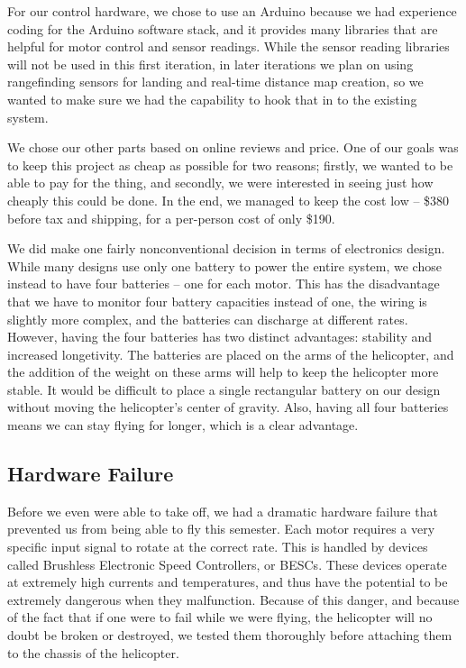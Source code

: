 \documentclass[letterpaper]{article}
\begin{document}
For our control hardware, we chose to use an Arduino because we had
experience coding for the Arduino software stack, and it provides many
libraries that are helpful for motor control and sensor
readings. While the sensor reading libraries will not be used in this
first iteration, in later iterations we plan on using rangefinding
sensors for landing and real-time distance map creation, so we wanted
to make sure we had the capability to hook that in to the existing
system.

We chose our other parts based on online reviews and price. One of our
goals was to keep this project as cheap as possible for two reasons;
firstly, we wanted to be able to pay for the thing, and secondly, we
were interested in seeing just how cheaply this could be done. In the
end, we managed to keep the cost low -- \$380 before tax and shipping,
for a per-person cost of only \$190.

We did make one fairly nonconventional decision in terms of
electronics design. While many designs use only one battery to power
the entire system, we chose instead to have four batteries -- one for
each motor. This has the disadvantage that we have to monitor four
battery capacities instead of one, the wiring is slightly more
complex, and the batteries can discharge at different rates. However,
having the four batteries has two distinct advantages: stability and
increased longetivity. The batteries are placed on the arms of the
helicopter, and the addition of the weight on these arms will help to
keep the helicopter more stable. It would be difficult to place a
single rectangular battery on our design without moving the
helicopter's center of gravity. Also, having all four batteries means
we can stay flying for longer, which is a clear advantage.

\subsection{Hardware Failure}
\label{sec:failure}
Before we even were able to take off, we had a dramatic hardware
failure that prevented us from being able to fly this semester. Each
motor requires a very specific input signal to rotate at the correct
rate. This is handled by devices called Brushless Electronic Speed
Controllers, or BESCs. These devices operate at extremely high
currents and temperatures, and thus have the potential to be extremely
dangerous when they malfunction. Because of this danger, and because
of the fact that if one were to fail while we were flying, the
helicopter will no doubt be broken or destroyed, we tested them
thoroughly before attaching them to the chassis of the helicopter.
\end{document}
